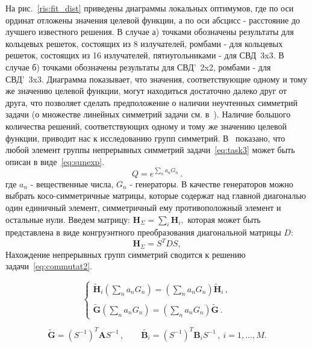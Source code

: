 На рис.~\ref{ris:fit_dist} приведены диаграммы локальных оптимумов, где по оси ординат отложены значения целевой функции, а по оси
абсцисс - расстояние до лучшего известного решения. В случае а) точками обозначены результаты для кольцевых решеток, состоящих из 8 излучателей, ромбами - для кольцевых решеток, состоящих из 16 излучателей, пятиугольниками - для СВД~3x3. В случае б) точками обозначены результаты для СВД'~2x2, ромбами - для СВД'~3x3. Диаграмма показывает, что значения, соответствующие одному и тому же значению целевой функции, могут находиться достаточно далеко друг от друга, что позволяет сделать предположение о наличии неучтенных симметрий задачи (о множестве линейных симметрий задачи см. в~\cite{yurkov:symmetry}).
Наличие большого количества решений, соответствующих одному и тому же значению целевой функции, приводит нас к исследованию групп симметрий. В~\cite{yurkov:symmetry} показано, что любой элемент группы непрерывных симметрий задачи~\ref{eq:task3} может быть описан в виде~\ref{eq:sunexp}.
\begin{equation}
\label{eq:sunexp}
Q=e^{\sum\limits_n a_n G_n} \, .
\end{equation}
где $a_n$ - вещественные числа, $G_n$ - генераторы. В качестве генераторов можно выбрать косо-симметричные матрицы, которые содержат над главной диагональю один единичный элемент, симметричный ему противоположный элемент и остальные нули.
Введем матрицу: $ {\textbf{H}}_{\Sigma} = \sum_{i} \textbf{H}_i,$ которая может быть представлена в виде конгруэнтного преобразования диагональной матрицы $D$:
$${\textbf{H}}_{\Sigma} = S^TDS,$$
Нахождение непрерывных групп симметрий сводится к решению задачи~\ref{eq:commutat2}.

\begin{equation}
\label{eq:commutat2}
\left\{
\begin{array}{l}
\displaystyle
\tilde{\textbf{H}}_i \left(\sum\limits_na_nG_n\right) =
\left(\sum\limits_na_nG_n\right)\tilde{\textbf{H}}_i \, , \\ \\
\displaystyle
\tilde{\textbf{G}} \left(\sum\limits_na_nG_n\right) = \left(\sum\limits_na_nG_n\right)\tilde{\textbf{G}} \, .
\end{array}
\right.
\end{equation}

\begin{equation}
\tilde{\textbf{G}}=\left(S^{-1}\right)^T \textbf{A} S^{-1} \, , \qquad
\tilde{\textbf{B}_i}=\left(S^{-1}\right)^T \textbf{B}_i S^{-1} \, , \ i=1,\dots,M.
\end{equation}

